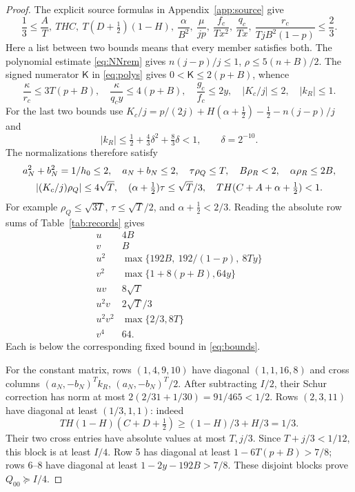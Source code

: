 \documentclass[10pt]{article}
\newcommand{\half}{\tfrac12}
\newcommand{\ps}{\succeq}
\begin{document}
\begin{proof}
The explicit source formulas in Appendix~\ref{app:source} give
\begin{equation}
 \frac13\leq
 \frac AT,\ THC,\ T(D+\half)(1-H),\ \frac{\alpha}{B^2},\
 \frac{\mu}{jp},\ \frac{f_c}{Tx^2},\ \frac{q_c}{Tx},\
 \frac{r_c}{TjB^2(1-p)}
 \leq\frac23. \label{eq:scaled}
\end{equation}
Here a list between two bounds means that every member satisfies both.
The polynomial estimate \eqref{eq:NNrem} gives
$n(j-p)/j\leq1$, $\rho\leq5(n+B)/2$. The signed numerator $\mathsf K$
in \eqref{eq:polys} gives $0<\mathsf K\leq2(p+B)$, whence
\begin{equation}
 \frac{\kappa}{r_c}\leq3T(p+B),\quad
 \frac{\kappa}{q_cy}\leq4(p+B),\quad
 \frac{g_c}{f_c}\leq2y,\quad
 |K_c/j|\leq2,\quad |k_R|\leq1.
 \label{eq:normalbounds}
\end{equation}
For the last two bounds use
$K_c/j=p/(2j)+H(\alpha+\half)-\half-n(j-p)/j$ and
\[
 |k_R|\leq\half+\tfrac43\delta^2+\tfrac83\delta<1,\qquad\delta=2^{-10}.
\]
The normalizations therefore satisfy
\begin{gather}
 a_N^2+b_N^2=1/h_0\leq2,\quad a_N+b_N\leq2,\quad
 \tau\rho_Q\leq T,\quad B\rho_R<2,\quad\alpha\rho_R\leq2B,\notag\\
 |(K_c/j)\rho_Q|\leq4\sqrt T,\quad
 (\alpha+\half)\tau\leq\sqrt T/3,\quad
 TH(C+A+\alpha+\half)<1. \label{eq:normalizationbounds}
\end{gather}
For example $\rho_Q\leq\sqrt{3T}$, $\tau\leq\sqrt T/2$,
and $\alpha+\half<2/3$.
Reading the absolute row sums of Table~\ref{tab:records} gives
\[
\begin{array}{c|l}
u&4B\\ v&B\\
u^2&\max\{192B,\ 192/(1-p),\ 8Ty\}\\
v^2&\max\{1+8(p+B),64y\}\\
uv&8\sqrt T\\u^2v&2\sqrt T/3\\
u^2v^2&\max\{2/3,8T\}\\v^4&64 .
\end{array}
\]
Each is below the corresponding fixed bound in \eqref{eq:bounds}.

For the constant matrix, rows $(1,4,9,10)$ have diagonal $(1,1,16,8)$
and cross columns $(a_N,-b_N)^Tk_R$, $(a_N,-b_N)^T/2$.
After subtracting $I/2$, their Schur correction has norm at most
$2(2/31+1/30)=91/465<1/2$.
Rows $(2,3,11)$ have diagonal at least $(1/3,1,1)$: indeed
\[
 TH(1-H)(C+D+\half)\geq(1-H)/3+H/3=1/3.
\]
Their two cross entries have absolute values at most $T,j/3$.
Since $T+j/3<1/12$, this block is at least $I/4$.
Row 5 has diagonal at least $1-6T(p+B)>7/8$; rows 6--8
have diagonal at least $1-2y-192B>7/8$.
These disjoint blocks prove $Q_{00}\ps I/4$.
\end{proof}
\end{document}
